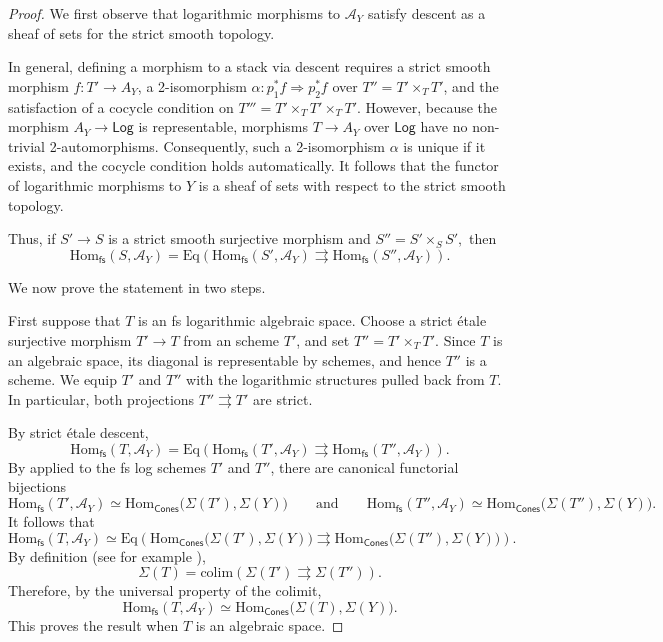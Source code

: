 \documentclass{article}
\begin{document}
\begin{proof}


We first observe that logarithmic morphisms to $\mathcal{A}_Y$ satisfy descent as a sheaf of sets for the strict smooth topology.

In general, defining a morphism to a stack via descent requires a strict smooth morphism $f \colon T' \to A_Y$, a 2-isomorphism $\alpha \colon p_1^* f \Rightarrow p_2^* f$ over $T'' = T' \times_T T'$, and the satisfaction of a cocycle condition on $T''' = T' \times_T T' \times_T T'$. However, because the morphism $A_Y \to \mathsf{Log}$ is representable, morphisms  $T \to A_Y$ over $\mathsf{Log}$ have no non-trivial 2-automorphisms. Consequently, such a 2-isomorphism $\alpha$ is unique if it exists, and the cocycle condition holds automatically. It follows that the functor of logarithmic morphisms to $Y$ is a sheaf of sets with respect to the strict smooth topology.



Thus, if $S'\to S$ is a strict smooth surjective morphism and
$
S''=S'\times_S S',
$
then
\[
\mathrm{Hom}_{\mathsf{fs}}(S,\mathcal{A}_Y)
=
\mathrm{Eq} \left(
\mathrm{Hom}_{\mathsf{fs}}(S',\mathcal{A}_Y)
\rightrightarrows
\mathrm{Hom}_{\mathsf{fs}}(S'',\mathcal{A}_Y)
\right).
\]


We now prove the statement in two steps.

First suppose that $T$ is an fs logarithmic algebraic space. Choose a
strict \'{e}tale surjective morphism
$
T'\longrightarrow T
$
from an scheme $T'$, and set
$
T''=T'\times_T T'.
$
Since $T$ is an algebraic space, its diagonal is representable by
schemes, and hence $T''$ is a scheme. We equip $T'$ and $T''$ with
the logarithmic structures pulled back from $T$. In particular, both
projections
$
T''\rightrightarrows T'
$
are strict.

By strict \'{e}tale descent,
\[
\mathrm{Hom}_{\mathsf{fs}}(T,\mathcal{A}_Y)
=
\mathrm{Eq}\left(
\mathrm{Hom}_{\mathsf{fs}}(T',\mathcal{A}_Y)
\rightrightarrows
\mathrm{Hom}_{\mathsf{fs}}(T'',\mathcal{A}_Y)
\right).
\]
By \cite[Proposition 2.10]{ACGSI} applied to the
fs log schemes $T'$ and $T''$, there are canonical functorial
bijections
\[
\mathrm{Hom}_{\mathsf{fs}}(T',\mathcal{A}_Y)
\simeq
\mathrm{Hom}_{\mathsf{Cones}}\bigl(\Sigma(T'),\Sigma(Y)\bigr)
\qquad \text{and} \qquad \mathrm{Hom}_{\mathsf{fs}}(T'',\mathcal{A}_Y)
\simeq
\mathrm{Hom}_{\mathsf{Cones}}\bigl(\Sigma(T''),\Sigma(Y)\bigr).
\]
It follows that
\[
\mathrm{Hom}_{\mathsf{fs}}(T,\mathcal{A}_Y)
\simeq
\mathrm{Eq}\left(
\mathrm{Hom}_{\mathsf{Cones}}\bigl(\Sigma(T'),\Sigma(Y)\bigr)
\rightrightarrows
\mathrm{Hom}_{\mathsf{Cones}}\bigl(\Sigma(T''),\Sigma(Y)\bigr)
\right).
\]
By definition (see for example \cite[Section 2.1.4]{ACGSI}),
\[
\Sigma(T)
=
\mathrm{colim}\left(
\Sigma(T')\rightrightarrows\Sigma(T'')
\right).
\]
Therefore, by the universal property of the colimit,
\[
\mathrm{Hom}_{\mathsf{fs}}(T,\mathcal{A}_Y)
\simeq
\mathrm{Hom}_{\mathsf{Cones}}\bigl(\Sigma(T),\Sigma(Y)\bigr).
\]
This proves the result when $T$ is an algebraic space.


\end{proof}
\end{document}
